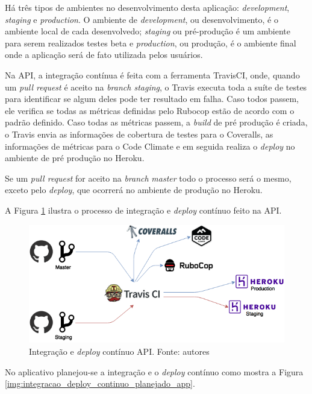Há três tipos de ambientes no desenvolvimento desta aplicação: \textit{development}, \textit{staging} e \textit{production}. O ambiente de \textit{development}, ou desenvolvimento, é o ambiente local de cada desenvolvedo; \textit{staging} ou pré-produção é um ambiente para serem realizados testes beta e \textit{production}, ou produção, é o ambiente final onde a aplicação será de fato utilizada pelos usuários.

Na API, a integração contínua é feita com a ferramenta TravisCI, onde, quando um \textit{pull request} é aceito na \textit{branch staging}, o Travis executa toda a suíte de testes para identificar se algum deles pode ter resultado em falha. Caso todos passem, ele verifica se todas as métricas definidas pelo Rubocop estão de acordo com o padrão definido. Caso todas as métricas passem, a \textit{build} de pré produção é criada, o Travis envia as informações de cobertura de testes para o Coveralls, as informações de métricas para o Code Climate e em seguida realiza o \textit{deploy} no ambiente de pré produção no Heroku.

Se um \textit{pull request} for aceito na \textit{branch} \textit{master} todo o processo será o mesmo, exceto pelo \textit{deploy}, que ocorrerá no ambiente de produção no Heroku.

A Figura \ref{img:integracao_deploy_continuo_api} ilustra o processo de integração e \textit{deploy} contínuo feito na API.

\begin{figure}[H]
    \centering
    \includegraphics[scale=0.5]{figuras/api_ci.png}
    \caption[Integração e \textit{deploy} contínuo na API]{Integração e \textit{deploy} contínuo API. Fonte: autores}
    \label{img:integracao_deploy_continuo_api}
\end{figure}
\pagebreak
No aplicativo planejou-se a integração e o \textit{deploy} contínuo como mostra a Figura \ref{img:integracao_deploy_continuo_planejado_app}.

